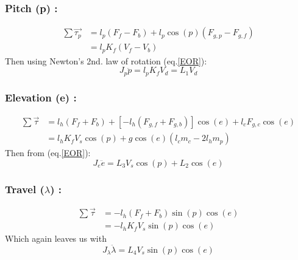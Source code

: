 
\subsubsection*{Pitch (p) :}
\begin{align*}
    \sum\vec{\tau_p} &= l_p(F_f-F_b) + l_p\cos(p)(F_{g,p}-F_{g,f})\\
     &= l_pK_f(V_f-V_b) 
\end{align*}
Then using Newton's 2nd. law of rotation (eq.\ref{EOR}):
\begin{equation}
    J_p\ddot{p} = l_pK_fV_d = L_1V_d \tag{3a}\label{3a}
\end{equation}


\subsubsection*{Elevation (e) :}
\begin{align*}
    \sum\vec{\tau} &= l_h(F_f+F_b) + [-l_h(F_{g,f}+F_{g,b})]\cos(e) + l_cF_{g,c}\cos(e)\\
    &= l_hK_fV_s\cos(p) + g\cos(e)(l_cm_c - 2l_hm_p)
\end{align*}
Then from (eq.\ref{EOR}):
\begin{equation}
    J_e\ddot{e} = L_3V_s\cos(p) + L_2\cos(e) \tag{3b} \label{3b}
\end{equation}


\subsubsection*{Travel ($\lambda$) :}
\begin{align*}
    \sum\vec{\tau} &= -l_h(F_f+F_b)\sin(p)\cos(e)\\
    &= -l_hK_fV_s\sin(p)\cos(e)
\end{align*}
Which again leaves us with
\begin{equation}
    J_\lambda\ddot{\lambda} = L_4V_s\sin(p)\cos(e) \tag{3c}\label{3c}
\end{equation}


\newpage %

